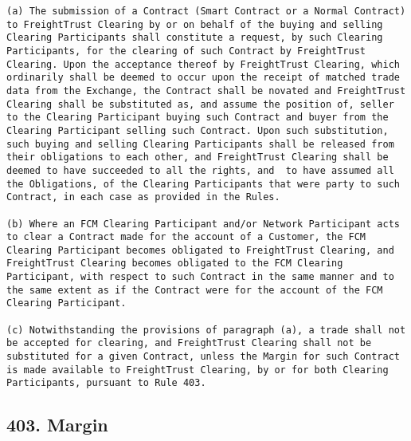 \documentclass[12pt]{article}
\begin{document}
\begin{verbatim}
(a) The submission of a Contract (Smart Contract or a Normal Contract) to FreightTrust Clearing by or on behalf of the buying and selling Clearing Participants shall constitute a request, by such Clearing Participants, for the clearing of such Contract by FreightTrust Clearing. Upon the acceptance thereof by FreightTrust Clearing, which ordinarily shall be deemed to occur upon the receipt of matched trade data from the Exchange, the Contract shall be novated and FreightTrust Clearing shall be substituted as, and assume the position of, seller to the Clearing Participant buying such Contract and buyer from the Clearing Participant selling such Contract. Upon such substitution, such buying and selling Clearing Participants shall be released from their obligations to each other, and FreightTrust Clearing shall be deemed to have succeeded to all the rights, and  to have assumed all the Obligations, of the Clearing Participants that were party to such Contract, in each case as provided in the Rules.

(b) Where an FCM Clearing Participant and/or Network Participant acts to clear a Contract made for the account of a Customer, the FCM Clearing Participant becomes obligated to FreightTrust Clearing, and FreightTrust Clearing becomes obligated to the FCM Clearing Participant, with respect to such Contract in the same manner and to the same extent as if the Contract were for the account of the FCM Clearing Participant.

(c) Notwithstanding the provisions of paragraph (a), a trade shall not be accepted for clearing, and FreightTrust Clearing shall not be substituted for a given Contract, unless the Margin for such Contract is made available to FreightTrust Clearing, by or for both Clearing Participants, pursuant to Rule 403.
\end{verbatim}

\hypertarget{margin}{%
\subsection{403. Margin}\label{margin}}
\end{document}
